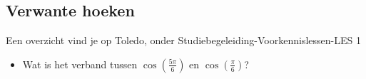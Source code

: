 \documentclass[11pt]{article}
\begin{document}
{\subsection{Verwante hoeken}
Een overzicht vind je op Toledo, onder Studiebegeleiding-Voorkennislessen-LES 1
\begin{itemize}
\item
Wat is het verband tussen $\cos({\frac{5 \pi}{6}})$ en
$\cos({\frac{\pi}{6}})$?
\end{itemize}

\vspace{2.5cm} 

\begin{itemize}

















\end{itemize}}
\end{document}
